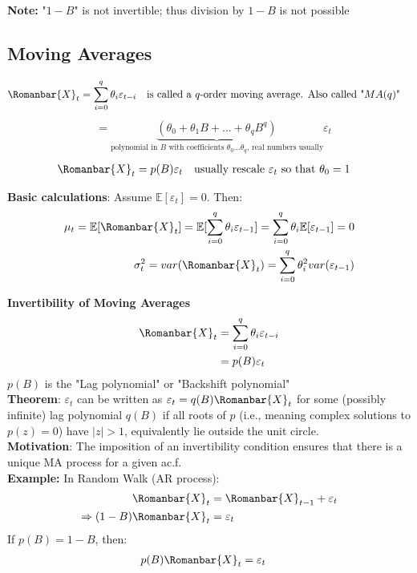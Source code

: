 \textbf{Note:} "$1-B$" is not invertible; thus division by $1-B$ is not possible

\subsection{Moving Averages}

\begin{align*}
  \Romanbar{X}_t&=\sum_{i=0}^q \theta_i\varepsilon_{t-i} &&\text{is called a $q$-order moving average. Also called "$MA(q)$"} 
\end{align*}
\begin{align*}
  &= \underbrace{(\theta_0+\theta_1B+...+\theta_qB^q)}_{\text{polynomial in $B$ with coefficients $\theta_0...\theta_q$, real numbers usually}}\varepsilon_t
\end{align*}
\begin{align*}
  \Romanbar{X}_t&=p(B)\varepsilon_t &&\text{usually rescale $\varepsilon_t$ so that $\theta_0=1$}
\end{align*}

\textbf{Basic calculations}: Assume $\mathbb{E}[\varepsilon_t]=0$. Then: 
\begin{align*}
    \mu_t=\mathbb{E}[\Romanbar{X}_t]=\mathbb{E}[\sum_{i=0}^q \theta_i \varepsilon_{t-1}]=\sum_{i=0}^q \theta_i \mathbb{E}[\varepsilon_{t-1}]=0 \\
\sigma^2_t=var(\Romanbar{X}_t)=\sum_{i=0}^q \theta_i^2 var(\varepsilon_{t-1}) 
\end{align*}

\textbf{Invertibility of Moving Averages}
\begin{align*}
    \Romanbar{X}_t&= \sum_{i=0}^q \theta_i\varepsilon_{t-i}\\
    &=p(B)\varepsilon_t\\
\end{align*}
$p(B)$ is the "Lag polynomial" or "Backshift polynomial"\\

\textbf{Theorem}: $\varepsilon_t$ can be written as $\varepsilon_t=q(B)\Romanbar{X}_t$ for some (possibly infinite) lag polynomial $q(B)$ if all roots of $p$ (i.e., meaning complex solutions to $p(z)=0$) have $|z|>1$, equivalently lie outside the unit circle. \\

\textbf{Motivation}: The imposition of an invertibility condition ensures that there is a unique MA process for a given ac.f.\\ 

\textbf{Example:} In Random Walk (AR process):
\begin{align*}
    \Romanbar{X}_t&=\Romanbar{X}_{t-1}+\varepsilon_t\\
    \Rightarrow (1-B)\Romanbar{X}_t&=\varepsilon_t
\end{align*}
If $p(B) = 1-B$, then:
\begin{align*}
    p(B)\Romanbar{X}_t&=\varepsilon_t
\end{align*}


